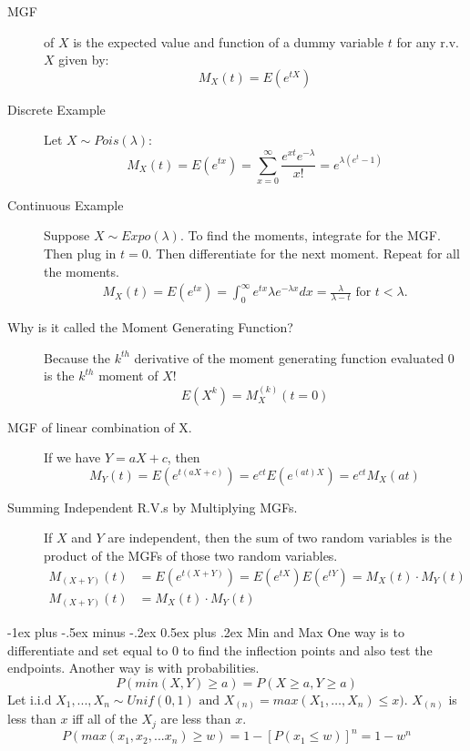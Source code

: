 \documentclass[10pt,landscape]{article}
\makeatletter
\theoremstyle{definition}
\renewcommand{\section}{\@startsection{section}{1}{0mm}%
                                {-1ex plus -.5ex minus -.2ex}%
                                {0.5ex plus .2ex}%
                                {\normalfont\large\bfseries}}
\makeatother
\begin{document}
\begin{multicols}{3}
\begin{description}
    \item[MGF] of $X$ is the expected value and function of a dummy variable $t$ for any r.v. $X$ given by:
        \[ M_X(t) = E(e^{tX}) \]
	\item[Discrete Example] Let $X \sim Pois(\lambda)$:
    \[M_X(t) = E(e^{tx}) = \sum_{x=0}^\infty \frac{e^{xt}e^{-\lambda}}{x!}=e^{\lambda(e^t-1)} \]    
    \item[Continuous Example] Suppose $X \sim Expo(\lambda)$. To find the moments, integrate for the MGF. Then plug in $t=0$. Then differentiate for the next moment. Repeat for all the moments.
    \begin{align*}
       M_X(t)=E(e^{tx})=\int_{0}^{\infty} e^{tx}\lambda e^{-\lambda x} dx = \frac{\lambda}{\lambda - t} \text{ for } t<\lambda.
    \end{align*}
    \item[Why is it called the Moment Generating Function?] Because the $k^{th}$ derivative of the moment generating function evaluated 0 is the $k^{th}$ moment of $X$!
    \[E(X^k) = M_X^{(k)}(t=0)\]

    \item[MGF of linear combination of X.] If we have $Y = aX + c$, then
        \[M_Y(t) = E(e^{t(aX + c)}) =  e^{ct}E(e^{(at)X}) = e^{ct}M_X(at)\]
        
        
    \item[Summing Independent R.V.s by Multiplying MGFs.] If $X$ and $Y$ are independent, then the sum of two random variables is the product of the MGFs of those two random variables.
    \begin{align*}
        M_{(X+Y)}(t) &= E(e^{t(X + Y)}) = E(e^{tX})E(e^{tY}) = M_X(t) \cdot M_Y(t) \\
        M_{(X+Y)}(t) &= M_X(t) \cdot M_Y(t)
    \end{align*}
\end{description}

\section{Min and Max}
One way is to differentiate and set equal to 0 to find the inflection points and also test the endpoints. Another way is with probabilities. 
\[P(min(X,Y)\geq a)=P(X\geq a, Y \geq a)\]
Let i.i.d $X_1,..., X_n \sim Unif(0,1) \text{ and } X_{(n)}=max(X_1,\dots, X_n)\leq x)$. $X_{(n)}$ is less than $x$ iff all of the $X_j$ are less than $x$. 
\[P(max(x_1,x_2,...x_n) \geq w)=1-[P(x_1\leq w)]^n=1-w^n\]

\end{multicols}
\end{document}
